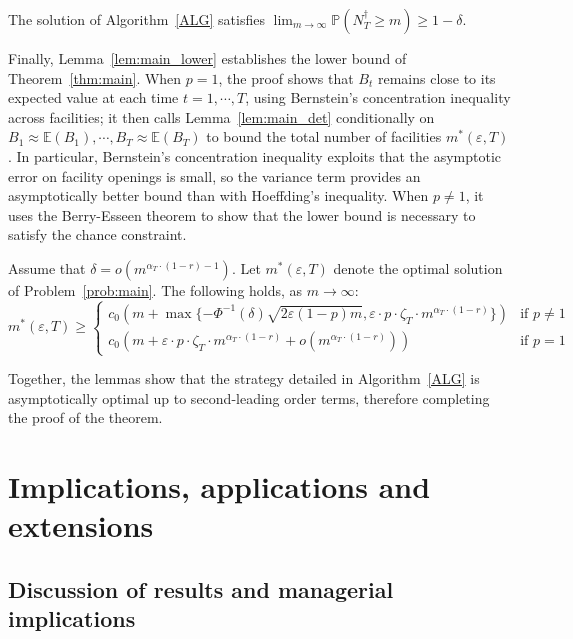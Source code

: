 \documentclass[nonblindrev]{informs3noheader}
\def\E{\mathbb{E}}
\def\P{\mathbb{P}}
\begin{document}
\begin{lemma}\label{lem:main_feasible}
The solution of Algorithm~\ref{ALG} satisfies $\lim_{m \to \infty} \P(N^\dagger_T \geq m) \geq 1-\delta$.
\end{lemma}

Finally, Lemma~\ref{lem:main_lower} establishes the lower bound of Theorem~\ref{thm:main}. When $p=1$, the proof shows that $B_t$ remains close to its expected value at each time $t=1,\cdots,T$, using Bernstein's concentration inequality across facilities; it then calls Lemma~\ref{lem:main_det} conditionally on $B_1\approx\E(B_1),\cdots,B_T\approx\E(B_T)$ to bound the total number of facilities $m^*(\varepsilon, T)$. In particular, Bernstein's concentration inequality exploits that the asymptotic error on facility openings is small, so the variance term provides an asymptotically better bound than with Hoeffding's inequality.  When $p\neq1$, it uses the Berry-Esseen theorem to show that the lower bound is necessary to satisfy the chance constraint.

\begin{lemma}\label{lem:main_lower}
Assume that $\delta = o\left(m^{\alpha_T\cdot(1-r)-1}\right)$. Let $m^*(\varepsilon, T)$ denote the optimal solution of Problem~\eqref{prob:main}. The following holds, as $m \to \infty$:
  \[m^*(\varepsilon, T) \geq   \begin{cases}
  c_0\left(m +\max\{-\Phi^{-1}(\delta)\sqrt{2\varepsilon(1-p)m},\varepsilon\cdot p\cdot\zeta_T\cdot m^{\alpha_T\cdot(1-r)}\}\right) & \text{if }p \neq 1\\
      c_0\left(m + \varepsilon\cdot p\cdot\zeta_T\cdot m^{\alpha_T\cdot(1-r)} +  o\left(m^{\alpha_T\cdot(1-r)}\right)\right) & \text{if }p=1
  \end{cases}\]
\end{lemma}

Together, the lemmas show that the strategy detailed in Algorithm~\ref{ALG} is asymptotically optimal up to second-leading order terms, therefore completing the proof of the theorem.\hfill\Halmos

\section{Implications, applications and extensions}
\label{sec:implications}

\subsection{Discussion of results and managerial implications}
\label{subsec:insights}
\end{document}
